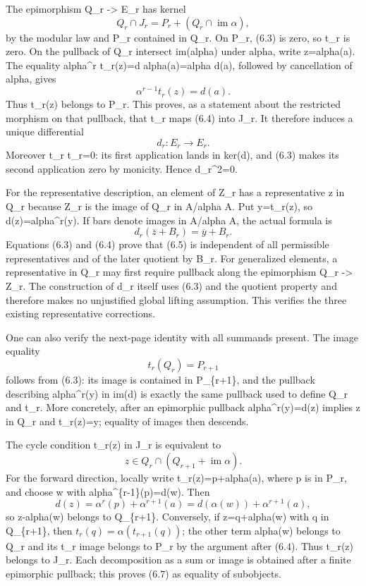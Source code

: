 The epimorphism Q\_r -\textgreater{} E\_r has kernel \[
Q_r\cap J_r=P_r+(Q_r\cap\operatorname{im}\alpha),           \tag{6.4}
\] by the modular law and P\_r contained in Q\_r. On P\_r, (6.3) is zero, so t\_r is zero. On the pullback of Q\_r intersect im(alpha) under alpha, write z=alpha(a). The equality alpha\^{}r t\_r(z)=d alpha(a)=alpha d(a), followed by cancellation of alpha, gives \[
\alpha^{r-1}t_r(z)=d(a).
\] Thus t\_r(z) belongs to P\_r. This proves, as a statement about the restricted morphism on that pullback, that t\_r maps (6.4) into J\_r. It therefore induces a unique differential \[
d_r:E_r\longrightarrow E_r.
\] Moreover t\_r t\_r=0: its first application lands in ker(d), and (6.3) makes its second application zero by monicity. Hence d\_r\^{}2=0.

For the representative description, an element of Z\_r has a representative z in Q\_r because Z\_r is the image of Q\_r in A/alpha A. Put y=t\_r(z), so d(z)=alpha\^{}r(y). If bars denote images in A/alpha A, the actual formula is \[
d_r(\overline z+B_r)=\overline y+B_r.                     \tag{6.5}
\] Equations (6.3) and (6.4) prove that (6.5) is independent of all permissible representatives and of the later quotient by B\_r. For generalized elements, a representative in Q\_r may first require pullback along the epimorphism Q\_r -\textgreater{} Z\_r. The construction of d\_r itself uses (6.3) and the quotient property and therefore makes no unjustified global lifting assumption. This verifies the three existing representative corrections.

One can also verify the next-page identity with all summands present. The image equality \[
t_r(Q_r)=P_{r+1}                                         \tag{6.6}
\] follows from (6.3): its image is contained in P\_\{r+1\}, and the pullback describing alpha\^{}r(y) in im(d) is exactly the same pullback used to define Q\_r and t\_r. More concretely, after an epimorphic pullback alpha\^{}r(y)=d(z) implies z in Q\_r and t\_r(z)=y; equality of images then descends.

The cycle condition t\_r(z) in J\_r is equivalent to \[
z\in Q_r\cap(Q_{r+1}+\operatorname{im}\alpha).             \tag{6.7}
\] For the forward direction, locally write t\_r(z)=p+alpha(a), where p is in P\_r, and choose w with alpha\^{}\{r-1\}(p)=d(w). Then \[
d(z)=\alpha^r(p)+\alpha^{r+1}(a)
     =d(\alpha(w))+\alpha^{r+1}(a),
\] so z-alpha(w) belongs to Q\_\{r+1\}. Conversely, if z=q+alpha(w) with q in Q\_\{r+1\}, then \(t_r(q)=\alpha(t_{r+1}(q))\); the other term alpha(w) belongs to Q\_r and its t\_r image belongs to P\_r by the argument after (6.4). Thus t\_r(z) belongs to J\_r. Each decomposition as a sum or image is obtained after a finite epimorphic pullback; this proves (6.7) as equality of subobjects.

